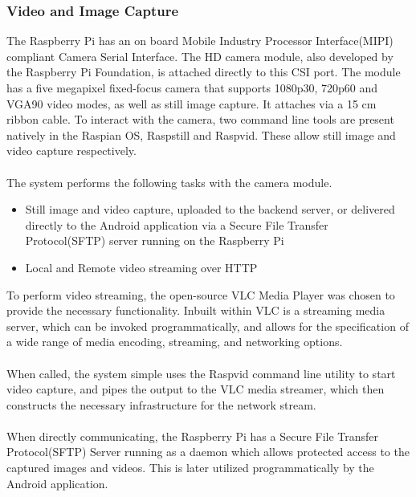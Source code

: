 \documentclass{article}
\begin{document}
\subsubsection{Video and Image Capture}
The Raspberry Pi has an on board Mobile Industry Processor Interface(MIPI) compliant Camera Serial Interface. The HD camera module, also developed by the Raspberry Pi Foundation, is attached directly to this CSI port. The module has a five megapixel fixed-focus camera that supports 1080p30, 720p60 and VGA90 video modes, as well as still image capture. It attaches via a 15 cm ribbon cable. To interact with the camera, two command line tools are present natively in the Raspian OS, Raspstill and Raspvid. These allow still image and video capture respectively. \\\\
The system performs the following tasks with the camera module.
\begin{itemize}
  \item Still image and video capture, uploaded to the backend server, or delivered 	directly to the Android application via a Secure File Transfer Protocol(SFTP) server running on the Raspberry Pi
  \item Local and Remote video streaming over HTTP
\end{itemize}
To perform video streaming, the open-source VLC Media Player was chosen to provide the necessary functionality. Inbuilt within VLC is a streaming media server, which can be invoked programmatically, and allows for the specification of a wide range of media encoding, streaming, and networking options.\\\\
When called, the system simple uses the Raspvid command line utility to start video capture, and pipes the output to the VLC media streamer, which then constructs the necessary infrastructure for the network stream. \\\\
When directly communicating, the Raspberry Pi has a Secure File Transfer Protocol(SFTP) Server running as a daemon which allows protected access to the captured images and videos. This is later utilized programmatically by the Android application.
\end{document}
